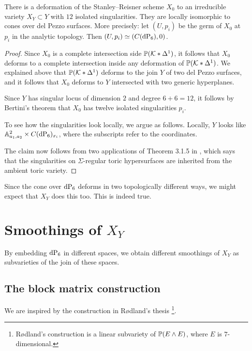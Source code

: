 \begin{proposition}
There is a deformation of the Stanley--Reisner scheme $X_0$ to an irreducible \CY variety $X_Y \subset Y$ with $12$ isolated singularities. They are locally isomorphic to cones over del Pezzo surfaces. More precisely: let $(U,p_i)$ be the germ of $X_0$ at $p_i$ in the analytic topology. Then $(U,p_i) \simeq (C(\dP6),0)$.
\end{proposition}
\begin{proof}
Since $X_0$ is a complete intersection side $\P(\K \ast \Delta^1)$, it follows that $X_0$ deforms to a complete intersection inside any deformation of $\P(\K \ast \Delta^1)$. We explained above that $\P(\K \ast \Delta^1)$ deforms to the join $Y$ of two del Pezzo surfaces, and it follows that $X_0$ deforms to $Y$ intersected with two generic hyperplanes.

Since $Y$ has singular locus of dimension $2$ and degree $6+6=12$, it follows by Bertini's theorem \cite[Chapter II, Theorem 8.18]{hartshorne} that $X_0$ has twelve isolated singularities $p_i$.

To see how the singularities look locally, we argue as follows. Locally, $Y$ looks like $\A^2_{a_1,a_2} \times C(\dP6)_{x_i}$, where the subscripts refer to the coordinates.

The claim now follows from two applications of Theorem 3.1.5 in \cite{batyrev_mirrorsymmetry}, which says that the singularities on $\Sigma$-regular toric hypersurfaces are inherited from the ambient toric variety.
\end{proof}

Since the cone over $\dP6$ deforms in two topologically different ways, we might expect that $X_Y$ does this too. This is indeed true.

\section{Smoothings of $X_Y$}

By embedding $\dP6$ in different spaces, we obtain different smoothings of $X_Y$ as subvarieties of the join of these spaces.

\subsection{The block matrix construction}

We are inspired by the construction in Rødland's thesis \cite{rodland_pfaffian}\footnote{Rødland's construction is a linear subvariety of $\P(E \wedge E)$, where $E$ is $7$-dimensional.}.

